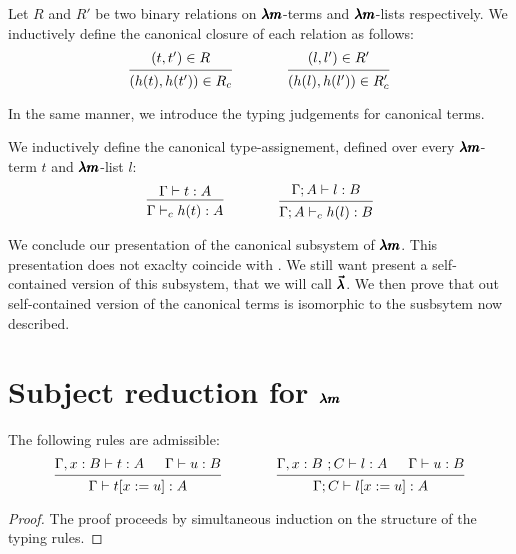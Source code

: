 \begin{definition}
  Let $R$ and $R'$ be two binary relations on $\pmb{\lambda m}$-terms and $\pmb{\lambda m}$-lists respectively.
  We inductively define the canonical closure of each relation as follows:
  \[
    \begin{prooftree}
      \hypo{ (t, t') \in R }
      \infer1{ (h(t), h(t')) \in R_c } 
    \end{prooftree}
    \qquad \qquad
    \begin{prooftree}
      \hypo{ (l, l') \in R' }
      \infer1{ (h(l), h(l')) \in R'_c } 
    \end{prooftree}
  \]
\end{definition}

In the same manner, we introduce the typing judgements for canonical terms.

\begin{definition}
  \label{canonical_typing}
  We inductively define the canonical type-assignement, defined over every $\pmb{\lambda m}$-term $t$ and $\pmb{\lambda m}$-list $l$:
  \[
    \begin{prooftree}
      \hypo{ \Gamma \vdash t:A }
      \infer1{ \Gamma \vdash_c h(t):A } 
    \end{prooftree}
    \qquad \qquad
    \begin{prooftree}
      \hypo{ \Gamma ; A \vdash l:B }
      \infer1{ \Gamma ; A \vdash_c h(l):B }.
    \end{prooftree}
  \]
\end{definition}

We conclude our presentation of the canonical subsystem of $\pmb{\lambda m}$.
This presentation does not exaclty coincide with \cite{JCES2002}.
We still want present a self-contained version of this subsystem, that we will call $\pmb{\vec \lambda}$.
We then prove that out self-contained version of the canonical terms is isomorphic to the susbsytem now described.


\section{Subject reduction for $\pmb{\lambda m}$}

\begin{lemma}
  \label{type_substitution}
  The following rules are admissible:
  \[
    \begin{prooftree}
      \hypo{ \Gamma , x:B \vdash t:A }
      \hypo{ \Gamma \vdash u:B }
      \infer2{ \Gamma \vdash  t[x := u] : A }      
    \end{prooftree}
    \qquad \qquad
    \begin{prooftree}
      \hypo{ \Gamma , x:B \ ; C \vdash l:A }
      \hypo{ \Gamma \vdash u:B }
      \infer2{ \Gamma ; C \vdash  l[x := u] : A }
    \end{prooftree}
  \]
\end{lemma}
\begin{proof}
  The proof proceeds by simultaneous induction on the structure of the typing rules.
\end{proof}


